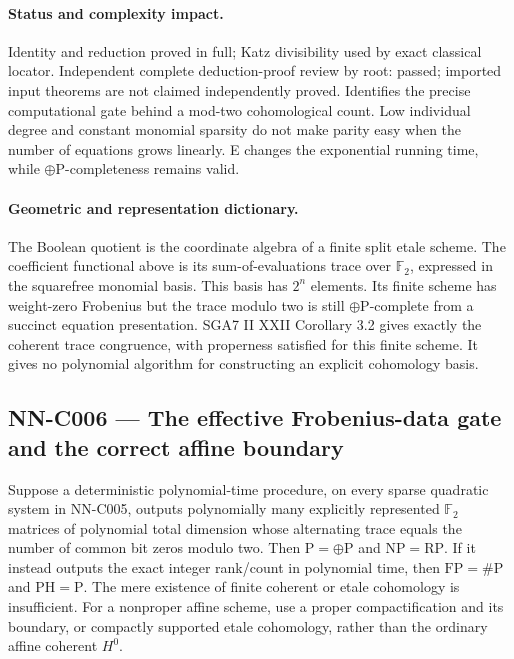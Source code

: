 \paragraph{Status and complexity impact.}
Identity and reduction proved in full; Katz divisibility used by exact classical locator. Independent complete deduction-proof review by root: passed; imported input theorems are not claimed independently proved. Identifies the precise computational gate behind a mod-two cohomological count. Low individual degree and constant monomial sparsity do not make parity easy when the number of equations grows linearly. E changes the exponential running time, while $\oplus\mathrm P$-completeness remains valid.

\paragraph{Geometric and representation dictionary.}
The Boolean quotient is the coordinate algebra of a finite split etale scheme. The coefficient functional above is its sum-of-evaluations trace over $\mathbb F_2$, expressed in the squarefree monomial basis. This basis has $2^n$ elements. Its finite scheme has weight-zero Frobenius but the trace modulo two is still $\oplus\mathrm P$-complete from a succinct equation presentation. SGA7 II XXII Corollary 3.2 gives exactly the coherent trace congruence, with properness satisfied for this finite scheme. It gives no polynomial algorithm for constructing an explicit cohomology basis.

\subsection{NN-C006 --- The effective Frobenius-data gate and the correct affine boundary}
\begin{proposition}[NN-C006]
Suppose a deterministic polynomial-time procedure, on every sparse quadratic system in NN-C005, outputs polynomially many explicitly represented $\mathbb F_2$ matrices of polynomial total dimension whose alternating trace equals the number of common bit zeros modulo two. Then $\mathrm P=\oplus\mathrm P$ and $\mathrm{NP}=\mathrm{RP}$. If it instead outputs the exact integer rank/count in polynomial time, then $\mathrm{FP}=\#\mathrm P$ and $\mathrm{PH}=\mathrm P$. The mere existence of finite coherent or etale cohomology is insufficient. For a nonproper affine scheme, use a proper compactification and its boundary, or compactly supported etale cohomology, rather than the ordinary affine coherent $H^0$.
\end{proposition}
